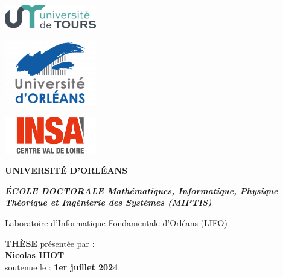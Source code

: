 \thispagestyle{empty}

{\setlength{\parindent}{0cm}

\begin{sffamily}

\begin{minipage}{1cm}
\includegraphics[width=4cm]{logos/logoTours.png} 
\end{minipage}
\hfill
\begin{minipage}{1cm}
\includegraphics[width=4cm]{logos/logoOrleans2022.png} 
\end{minipage}
\hfill
\begin{minipage}{3cm}
\includegraphics[width=4cm]{logos/logoINSA.png} 
\end{minipage}

\vspace{0.5cm}
\begin{minipage}{15.5cm}
\centering
\LARGE\textbf{UNIVERSITÉ D'ORLÉANS}
\end{minipage}
\hfill

\vspace{0.3cm}

\begin{minipage}{\textwidth}
\centering
\Large\textit{\textbf{ÉCOLE DOCTORALE Mathématiques, Informatique, Physique Théorique et Ingénierie des Systèmes (MIPTIS)}}

Laboratoire d'Informatique Fondamentale d'Orléans (LIFO)
\end{minipage}

\vspace{0.3cm}

\begin{minipage}{\textwidth}
\centering\LARGE
\textbf{THÈSE} \normalsize présentée par : \\
\vspace{0.3cm}
\LARGE\textbf{Nicolas HIOT}\\
\vspace{0.3cm}
soutenue le : \textbf{1er juillet 2024}
\end{minipage}
	

\end{sffamily}}
